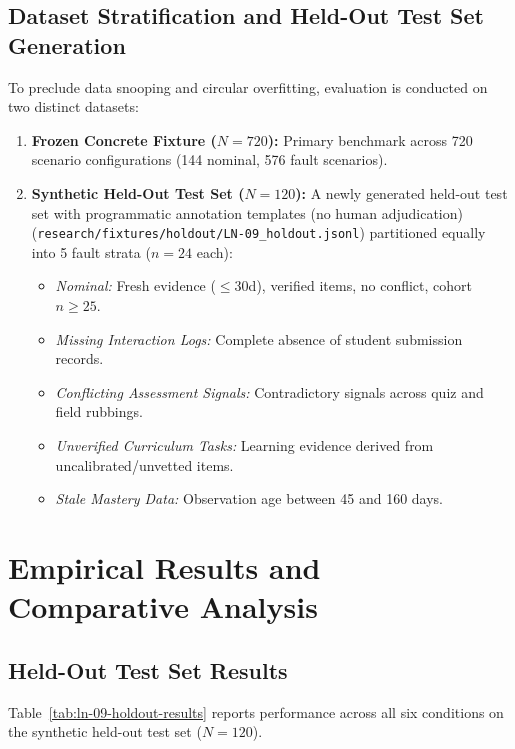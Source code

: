 \documentclass[11pt,a4paper]{article}
\begin{document}
\subsection{Dataset Stratification and Held-Out Test Set Generation}
To preclude data snooping and circular overfitting, evaluation is conducted on two distinct datasets:
\begin{enumerate}
    \item \textbf{Frozen Concrete Fixture ($N=720$):} Primary benchmark across 720 scenario configurations (144 nominal, 576 fault scenarios).
    \item \textbf{Synthetic Held-Out Test Set ($N=120$):} A newly generated held-out test set with programmatic annotation templates (no human adjudication) (\texttt{research/fixtures/holdout/LN-09\_holdout.jsonl}) partitioned equally into 5 fault strata ($n=24$ each):
    \begin{itemize}
        \item \textit{Nominal:} Fresh evidence ($\le 30$d), verified items, no conflict, cohort $n \ge 25$.
        \item \textit{Missing Interaction Logs:} Complete absence of student submission records.
        \item \textit{Conflicting Assessment Signals:} Contradictory signals across quiz and field rubbings.
        \item \textit{Unverified Curriculum Tasks:} Learning evidence derived from uncalibrated/unvetted items.
        \item \textit{Stale Mastery Data:} Observation age between 45 and 160 days.
    \end{itemize}
\end{enumerate}

\section{Empirical Results and Comparative Analysis}

\subsection{Held-Out Test Set Results}
Table~\ref{tab:ln-09-holdout-results} reports performance across all six conditions on the synthetic held-out test set ($N=120$).


\end{document}
